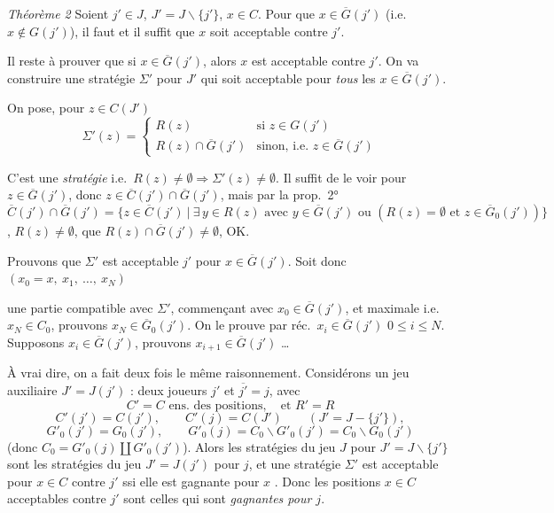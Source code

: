 \documentclass[11pt,a4paper]{article}
\begin{document}
\emph{Théorème 2} Soient $j'\in J$, $J'=J\smallsetminus\{j'\}$, $x\in C$. Pour que $x\in\overline{G}(j')$ (i.e.\ $x\notin G(j')$), il faut et il suffit que $x$ soit acceptable contre $j'$.

Il reste à prouver que si $x\in\overline{G}(j')$, alors $x$ est acceptable contre $j'$. On va construire une stratégie $\Sigma'$ pour $J'$ qui soit acceptable pour \emph{tous} les $x\in\overline{G}(j')$.

On pose, pour $z\in C(J')$
\[
  \Sigma'(z)=\begin{cases}
    R(z) & \text{si } z\in G(j')\\
    R(z)\cap\overline{G}(j') & \text{sinon, i.e.\ } z\in\overline{G}(j')
  \end{cases}
\]

C'est une \emph{stratégie} i.e.\ $R(z)\neq\emptyset\Longrightarrow\Sigma'(z)\neq\emptyset$. Il suffit de le voir pour $z\in\overline{G}(j')$, donc $z\in\overline{C}(j')\cap\overline{G}(j')$, mais par la prop.\ 2°
\[
  \overline{C}(j')\cap\overline{G}(j')=\bigl\{z\in\overline{C}(j')\ \big|\ \exists\,y\in R(z) \text{ avec } y\in\overline{G}(j') \text{ ou } (R(z)=\emptyset \text{ et } z\in\overline{G}_0(j'))\bigr\}
\]
,  $R(z)\neq\emptyset$, \ill{} que $R(z)\cap\overline{G}(j')\neq\emptyset$, OK.

Prouvons que $\Sigma'$ est acceptable  $j'$ pour $x\in\overline{G}(j')$. Soit donc $(x_0=x,\ x_1,\ \ldots,\ x_N)$ \ill{}

une partie compatible avec $\Sigma'$, commençant avec $x_0\in\overline{G}(j')$, et maximale i.e.\ $x_N\in C_0$, prouvons $x_N\in\overline{G}_0(j')$. On le prouve par réc.\ $x_i\in\overline{G}(j')$ \quad $0\leqslant i\leqslant N$. Supposons $x_i\in\overline{G}(j')$, prouvons $x_{i+1}\in\overline{G}(j')$ …

À vrai dire, on a fait deux fois le même raisonnement. Considérons un jeu auxiliaire $J'=J(j')$ : deux joueurs $j'$ et $\overline{j'}=j$, avec
\[
  C'=C \text{ ens.\ des positions}, \quad \text{et } R'=R
\]
\[
  C'(j')=C(j'),\qquad C'(j)=C(J')\qquad (J'=J-\{j'\}),
\]
\[
  G'_0(j')=G_0(j'),\qquad G'_0(j)=C_0\smallsetminus G'_0(j')=C_0\smallsetminus G_0(j')
\]
(donc $C_0=G'_0(j)\amalg G'_0(j')$). Alors les stratégies \struck{\ill{}} du jeu $J$ pour $J'=J\smallsetminus\{j'\}$ sont les stratégies du jeu $J'=J(j')$ pour $j$, et une stratégie $\Sigma'$ est acceptable pour $x\in C$ contre $j'$ ssi elle est gagnante pour $x$ . Donc les positions $x\in C$ acceptables  contre $j'$ sont celles qui sont \emph{gagnantes pour $j$}.
\end{document}
